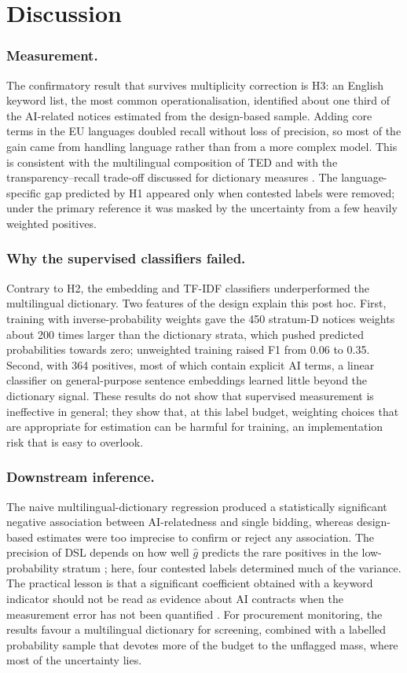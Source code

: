 \section{Discussion}
\subsubsection{Measurement.} The confirmatory result that survives multiplicity correction is H3: an English keyword list, the most common operationalisation, identified about one third of the AI-related notices estimated from the design-based sample. Adding core terms in the EU languages doubled recall without loss of precision, so most of the gain came from handling language rather than from a more complex model. This is consistent with the multilingual composition of TED \cite{ahmia2018} and with the transparency--recall trade-off discussed for dictionary measures \cite{gentzkow2019}. The language-specific gap predicted by H1 appeared only when contested labels were removed; under the primary reference it was masked by the uncertainty from a few heavily weighted positives.

\subsubsection{Why the supervised classifiers failed.} Contrary to H2, the embedding and TF-IDF classifiers underperformed the multilingual dictionary. Two features of the design explain this post hoc. First, training with inverse-probability weights gave the 450 stratum-D notices weights about 200 times larger than the dictionary strata, which pushed predicted probabilities towards zero; unweighted training raised F1 from 0.06 to 0.35. Second, with 364 positives, most of which contain explicit AI terms, a linear classifier on general-purpose sentence embeddings learned little beyond the dictionary signal. These results do not show that supervised measurement is ineffective in general; they show that, at this label budget, weighting choices that are appropriate for estimation can be harmful for training, an implementation risk that is easy to overlook.

\subsubsection{Downstream inference.} The naive multilingual-dictionary regression produced a statistically significant negative association between AI-relatedness and single bidding, whereas design-based estimates were too imprecise to confirm or reject any association. The precision of DSL depends on how well $\hat{g}$ predicts the rare positives in the low-probability stratum \cite{egami2023,audinet2025}; here, four contested labels determined much of the variance. The practical lesson is that a significant coefficient obtained with a keyword indicator should not be read as evidence about AI contracts when the measurement error has not been quantified \cite{battaglia2025}. For procurement monitoring, the results favour a multilingual dictionary for screening, combined with a labelled probability sample that devotes more of the budget to the unflagged mass, where most of the uncertainty lies.

